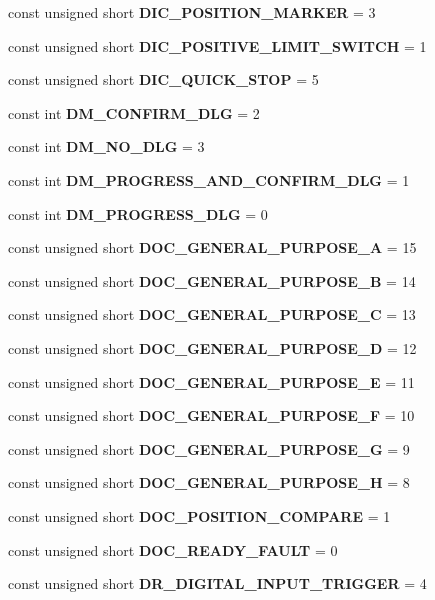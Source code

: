 \begin{DoxyCompactItemize}
\item 
const unsigned short {\bf \-D\-I\-C\-\_\-\-P\-O\-S\-I\-T\-I\-O\-N\-\_\-\-M\-A\-R\-K\-E\-R} = 3
\item 
const unsigned short {\bf \-D\-I\-C\-\_\-\-P\-O\-S\-I\-T\-I\-V\-E\-\_\-\-L\-I\-M\-I\-T\-\_\-\-S\-W\-I\-T\-C\-H} = 1
\item 
const unsigned short {\bf \-D\-I\-C\-\_\-\-Q\-U\-I\-C\-K\-\_\-\-S\-T\-O\-P} = 5
\item 
const int {\bf \-D\-M\-\_\-\-C\-O\-N\-F\-I\-R\-M\-\_\-\-D\-L\-G} = 2
\item 
const int {\bf \-D\-M\-\_\-\-N\-O\-\_\-\-D\-L\-G} = 3
\item 
const int {\bf \-D\-M\-\_\-\-P\-R\-O\-G\-R\-E\-S\-S\-\_\-\-A\-N\-D\-\_\-\-C\-O\-N\-F\-I\-R\-M\-\_\-\-D\-L\-G} = 1
\item 
const int {\bf \-D\-M\-\_\-\-P\-R\-O\-G\-R\-E\-S\-S\-\_\-\-D\-L\-G} = 0
\item 
const unsigned short {\bf \-D\-O\-C\-\_\-\-G\-E\-N\-E\-R\-A\-L\-\_\-\-P\-U\-R\-P\-O\-S\-E\-\_\-\-A} = 15
\item 
const unsigned short {\bf \-D\-O\-C\-\_\-\-G\-E\-N\-E\-R\-A\-L\-\_\-\-P\-U\-R\-P\-O\-S\-E\-\_\-\-B} = 14
\item 
const unsigned short {\bf \-D\-O\-C\-\_\-\-G\-E\-N\-E\-R\-A\-L\-\_\-\-P\-U\-R\-P\-O\-S\-E\-\_\-\-C} = 13
\item 
const unsigned short {\bf \-D\-O\-C\-\_\-\-G\-E\-N\-E\-R\-A\-L\-\_\-\-P\-U\-R\-P\-O\-S\-E\-\_\-\-D} = 12
\item 
const unsigned short {\bf \-D\-O\-C\-\_\-\-G\-E\-N\-E\-R\-A\-L\-\_\-\-P\-U\-R\-P\-O\-S\-E\-\_\-\-E} = 11
\item 
const unsigned short {\bf \-D\-O\-C\-\_\-\-G\-E\-N\-E\-R\-A\-L\-\_\-\-P\-U\-R\-P\-O\-S\-E\-\_\-\-F} = 10
\item 
const unsigned short {\bf \-D\-O\-C\-\_\-\-G\-E\-N\-E\-R\-A\-L\-\_\-\-P\-U\-R\-P\-O\-S\-E\-\_\-\-G} = 9
\item 
const unsigned short {\bf \-D\-O\-C\-\_\-\-G\-E\-N\-E\-R\-A\-L\-\_\-\-P\-U\-R\-P\-O\-S\-E\-\_\-\-H} = 8
\item 
const unsigned short {\bf \-D\-O\-C\-\_\-\-P\-O\-S\-I\-T\-I\-O\-N\-\_\-\-C\-O\-M\-P\-A\-R\-E} = 1
\item 
const unsigned short {\bf \-D\-O\-C\-\_\-\-R\-E\-A\-D\-Y\-\_\-\-F\-A\-U\-L\-T} = 0
\item 
const unsigned short {\bf \-D\-R\-\_\-\-D\-I\-G\-I\-T\-A\-L\-\_\-\-I\-N\-P\-U\-T\-\_\-\-T\-R\-I\-G\-G\-E\-R} = 4
\item 

\end{DoxyCompactItemize}
